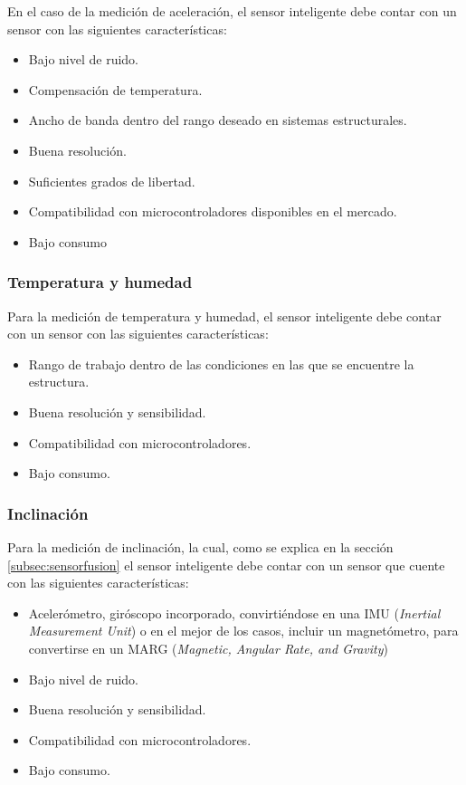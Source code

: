 En el caso de la medición de aceleración, el sensor inteligente debe contar con un sensor con las siguientes características:

\begin{itemize}
    \item Bajo nivel de ruido.
    \item Compensación de temperatura.
    \item Ancho de banda dentro del rango deseado en sistemas estructurales.
    \item Buena resolución.
    \item Suficientes grados de libertad.
    \item Compatibilidad con microcontroladores disponibles en el mercado.
    \item Bajo consumo
\end{itemize}

\subsubsection{Temperatura y humedad}

Para la medición de temperatura y humedad, el sensor inteligente debe contar con un sensor con las siguientes características:

\begin{itemize}
    \item Rango de trabajo dentro de las condiciones en las que se encuentre la estructura.
    \item Buena resolución y sensibilidad.
    \item Compatibilidad con microcontroladores.
    \item Bajo consumo.
\end{itemize}

\subsubsection{Inclinación}

Para la medición de inclinación, la cual, como se explica en la sección \ref{subsec:sensorfusion} el sensor inteligente debe contar con un sensor que cuente con las siguientes características:

\begin{itemize}
    \item Acelerómetro, giróscopo incorporado, convirtiéndose en una IMU (\textit{Inertial Measurement Unit}) o en el mejor de los casos,  incluir un magnetómetro, para convertirse en un MARG (\textit{Magnetic, Angular Rate, and Gravity})
    \item Bajo nivel de ruido.
    \item Buena resolución y sensibilidad.
    \item Compatibilidad con microcontroladores.
    \item Bajo consumo.
\end{itemize}

